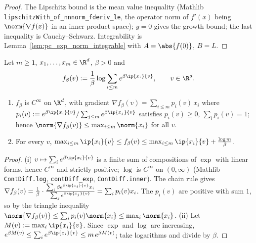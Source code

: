 \begin{proof}
\leanok
{}
The Lipschitz bound is the mean value inequality (Mathlib
\texttt{lipschitzWith\_of\_nnnorm\_fderiv\_le}, the operator norm of $f'(x)$ being
$\norm{\nabla f(x)}$ in an inner product space); $y = 0$ gives the growth bound; the last
inequality is Cauchy--Schwarz. Integrability is Lemma~\ref{lem:pc_exp_norm_integrable} with
$A = \abs{f(0)}$, $B = L$.
\end{proof}

\begin{lemma}\label{lem:logsumexp_props}
\leanok
Let $m \ge 1$, $x_1,\dots,x_m \in \R^d$, $\beta > 0$ and
\[
  f_\beta(v) := \frac1\beta\log\sum_{i\le m}e^{\beta\ip{x_i}{v}}, \qquad v \in \R^d .
\]
\begin{enumerate}
  \item[(i)] $f_\beta$ is $C^\infty$ on $\R^d$, with gradient
        $\nabla f_\beta(v) = \sum_{i\le m}p_i(v)\,x_i$ where
        $p_i(v) := e^{\beta\ip{x_i}{v}}/\sum_{j\le m}e^{\beta\ip{x_j}{v}}$ satisfies $p_i(v) \ge 0$,
        $\sum_ip_i(v) = 1$; hence $\norm{\nabla f_\beta(v)} \le \max_{i\le m}\norm{x_i}$ for all $v$.
  \item[(ii)] For every $v$,
        $\max_{i\le m}\ip{x_i}{v} \le f_\beta(v) \le \max_{i\le m}\ip{x_i}{v} + \frac{\log m}{\beta}$.
\end{enumerate}
\end{lemma}

\begin{proof}
\leanok
(i) $v \mapsto \sum_ie^{\beta\ip{x_i}{v}}$ is a finite sum of compositions of $\exp$ with
linear forms, hence $C^\infty$ and strictly positive; $\log$ is $C^\infty$ on $(0,\infty)$
(Mathlib \texttt{ContDiff.log}, \texttt{contDiff\_exp}, \texttt{ContDiff.inner}). The chain
rule gives $\nabla f_\beta(v) = \frac1\beta\cdot\frac{\sum_i\beta e^{\beta\ip{x_i}{v}}x_i}
{\sum_je^{\beta\ip{x_j}{v}}} = \sum_ip_i(v)x_i$. The $p_i(v)$ are positive with sum $1$, so by
the triangle inequality $\norm{\nabla f_\beta(v)} \le \sum_ip_i(v)\norm{x_i} \le \max_i\norm{x_i}$.
(ii) Let $M(v) := \max_i\ip{x_i}{v}$. Since $\exp$ and $\log$ are increasing,
$e^{\beta M(v)} \le \sum_ie^{\beta\ip{x_i}{v}} \le m\,e^{\beta M(v)}$; take logarithms and
divide by $\beta$.
\end{proof}

